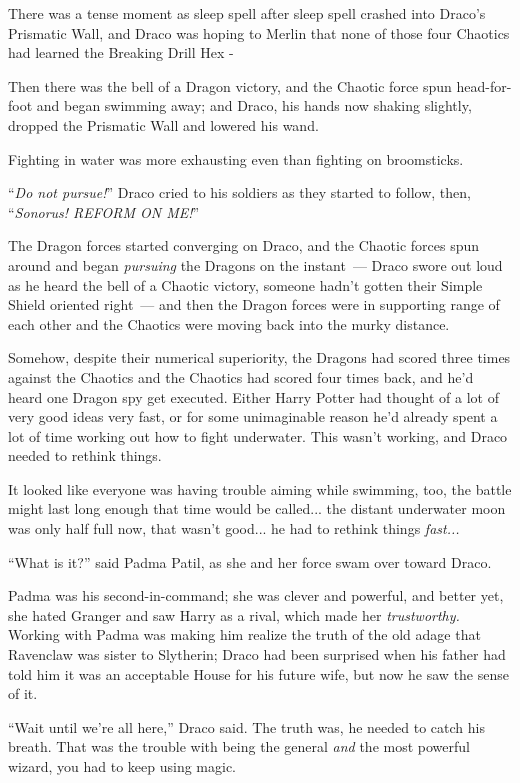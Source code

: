 There was a tense moment as sleep spell after sleep spell crashed into Draco's Prismatic Wall, and Draco was hoping to Merlin that none of those four Chaotics had learned the Breaking Drill Hex -

Then there was the bell of a Dragon victory, and the Chaotic force spun head-for-foot and began swimming away; and Draco, his hands now shaking slightly, dropped the Prismatic Wall and lowered his wand.

Fighting in water was more exhausting even than fighting on broomsticks.

``\emph{Do not pursue!}'' Draco cried to his soldiers as they started to follow, then, ``\emph{Sonorus! REFORM ON ME!}''

The Dragon forces started converging on Draco, and the Chaotic forces spun around and began \emph{pursuing} the Dragons on the instant~--- Draco swore out loud as he heard the bell of a Chaotic victory, someone hadn't gotten their Simple Shield oriented right~--- and then the Dragon forces were in supporting range of each other and the Chaotics were moving back into the murky distance.

Somehow, despite their numerical superiority, the Dragons had scored three times against the Chaotics and the Chaotics had scored four times back, and he'd heard one Dragon spy get executed. Either Harry Potter had thought of a lot of very good ideas very fast, or for some unimaginable reason he'd already spent a lot of time working out how to fight underwater. This wasn't working, and Draco needed to rethink things.

It looked like everyone was having trouble aiming while swimming, too, the battle might last long enough that time would be called... the distant underwater moon was only half full now, that wasn't good... he had to rethink things \emph{fast...}

``What is it?'' said Padma Patil, as she and her force swam over toward Draco.

Padma was his second-in-command; she was clever and powerful, and better yet, she hated Granger and saw Harry as a rival, which made her \emph{trustworthy.} Working with Padma was making him realize the truth of the old adage that Ravenclaw was sister to Slytherin; Draco had been surprised when his father had told him it was an acceptable House for his future wife, but now he saw the sense of it.

``Wait until we're all here,'' Draco said. The truth was, he needed to catch his breath. That was the trouble with being the general \emph{and} the most powerful wizard, you had to keep using magic.

